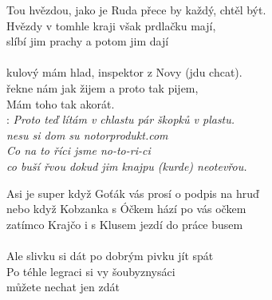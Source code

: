 
Tou hvězdou, jako je Ruda přece by každý, chtěl být.\\
Hvězdy v tomhle kraji však prdlačku mají,\\
slíbí jim prachy a potom jim dají\\
\\
kulový mám hlad, inspektor z Novy (jdu chcat).\\
řekne nám jak žijem a proto tak pijem,\\
Mám toho tak akorát.\\

\textregistered:
\emph{
Proto teď lítám v chlastu pár škopků v plastu.\\
nesu si dom su notorprodukt.com\\
Co na to říci jsme no-to-ri-ci\\
co buší řvou dokud jim knajpu (kurde) neotevřou.\\
}

Asi je super když Goťák vás prosí o podpis na hruď\\
nebo když Kobzanka s Óčkem hází po vás očkem\\
zatímco Krajčo i s Klusem jezdí do práce busem\\
\\
Ale slivku si dát po dobrým pivku jít spát\\
Po téhle legraci si vy šoubyznysáci\\
můžete nechat jen zdát

\textregistered \textregistered

\newpage
